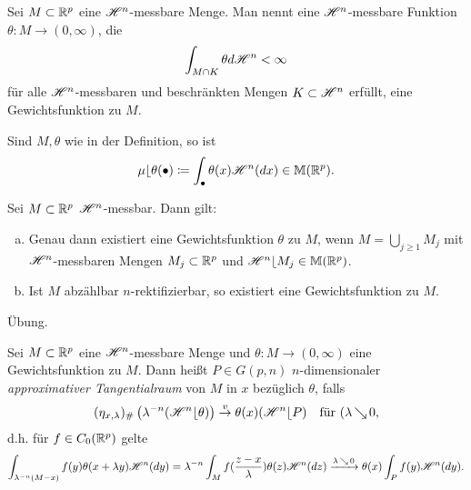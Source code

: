 \documentclass[a4paper,twoside,DIV15,BCOR12mm]{scrbook}
\newcommand{\HM}{\H}
\DeclareMathOperator{\downto}{\searrow}
\newcommand{\MR}{\lfloor}
\begin{document}
\begin{definition}
Sei \(M \subset \mathbb{R}^p\) eine \(\HM^n\)-messbare Menge. Man nennt eine \(\HM^n\)-messbare  Funktion \(\theta: M \to (0,\infty)\), die 
\[
\int_{M\cap K} \theta d\HM^n < \infty
\]
für alle \(\HM^n\)-messbaren und beschränkten Mengen \(K \subset \HM^n\)  erfüllt, 
eine Gewichtsfunktion zu \(M\).
\end{definition}

\begin{bemerkung}
Sind \(M, \theta\) wie in der Definition, so ist
\[
\mu\MR\theta(\bullet) \da \int_\bullet \theta(x) \HM^n(dx) \in \mathbb M(\MdR^p).
\]
\end{bemerkung}

\begin{lemma}\label{lem:3.23}
Sei \(M \subset \mathbb{R}^p\) \(\HM^n\)-messbar. Dann gilt:
\begin{enumerate}[(a)]
\item Genau dann existiert eine Gewichtsfunktion \(\theta\) zu \(M\), wenn \(M = \bigcup_{j\geq1} M_j\) mit \(\HM^n\)-messbaren Mengen \(M_j \subset \mathbb{R}^p\) und \(\HM^n \MR M_j \in \mathbb M(\MdR^p)\).
\item Ist \(M\) abzählbar \(n\)-rektifizierbar, so existiert eine Gewichtsfunktion zu \(M\).
\end{enumerate}
\end{lemma}
\begin{beweis} Übung. \end{beweis}

\begin{definition}
Sei \(M \subset \mathbb{R}^p\) eine \( \HM^n\)-messbare Menge und \(\theta: M \to (0,\infty)\) eine Gewichtsfunktion zu \(M\). Dann heißt \(P \in G(p,n)\) \(n\)-dimensionaler \emph{approximativer Tangentialraum} von \(M\) in \(x\) bezüglich \(\theta\), falls
\[
(\eta_{x,\lambda})_\# \left(\lambda^{-n}(\HM^n\MR \theta)\right) \overset{v}\to \theta(x) (\HM^n \MR P) \quad \text{für }(\lambda\downto0,
\]
d.h. für \(f\in C_0(\mathbb{R}^p)\) gelte
\[
\int_{\lambda^{-n}(M-x)} f(y) \theta(x+\lambda y) \HM^n(dy) = \lambda^{-n} \int_M f(\frac{z-x}\lambda) \theta(z) \HM^n(dz) \xrightarrow{\lambda\downto0} \theta(x) \int_P f(y) \HM^n(dy).
\]
\end{definition}
\end{document}
